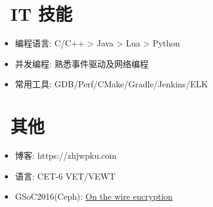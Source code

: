 \documentclass{resume}
\begin{document}
\section{\faWrench\ IT 技能}
\begin{itemize}[parsep=0.5ex]
  \item 编程语言: C/C++ > Java > Lua > Python
  \item 并发编程: 熟悉事件驱动及网络编程
  \item 常用工具: GDB/Perf/CMake/Gradle/Jenkins/ELK
\end{itemize}

\section{\faCogs\ 其他}
\begin{itemize}[parsep=0.5ex]
  \item 博客: https://zhjwpku.com
  \item 语言: CET-6 VET/VEWT
  \item GSoC2016(Ceph): \href{https://gist.github.com/zhjwpku/1bc4202671ed06c799f0bf4739416429}{On the wire encryption}
\end{itemize}
\end{document}
